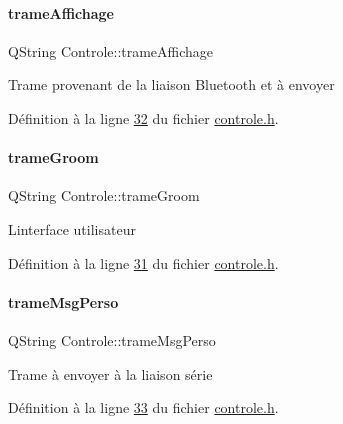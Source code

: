 \paragraph{\texorpdfstring{trame\+Affichage}{trameAffichage}}
{\footnotesize\ttfamily Q\+String Controle\+::trame\+Affichage\hspace{0.3cm}{\ttfamily [private]}}

Trame provenant de la liaison Bluetooth et à envoyer 

Définition à la ligne \hyperlink{controle_8h_source_l00032}{32} du fichier \hyperlink{controle_8h_source}{controle.\+h}.

\mbox{\label{class_controle_a5b9512ebbaf16746f55a9519de88f9be}} 
\paragraph{\texorpdfstring{trame\+Groom}{trameGroom}}
{\footnotesize\ttfamily Q\+String Controle\+::trame\+Groom\hspace{0.3cm}{\ttfamily [private]}}

L\textquotesingle{}interface utilisateur 

Définition à la ligne \hyperlink{controle_8h_source_l00031}{31} du fichier \hyperlink{controle_8h_source}{controle.\+h}.

\mbox{\label{class_controle_a5cb6dbeb8b2f066b1e757f3c933ea503}} 
\paragraph{\texorpdfstring{trame\+Msg\+Perso}{trameMsgPerso}}
{\footnotesize\ttfamily Q\+String Controle\+::trame\+Msg\+Perso\hspace{0.3cm}{\ttfamily [private]}}

Trame à envoyer à la liaison série 

Définition à la ligne \hyperlink{controle_8h_source_l00033}{33} du fichier \hyperlink{controle_8h_source}{controle.\+h}.

\mbox{\label{class_controle_a2dd60c955396dd80426c1a74f56ea611}} 
